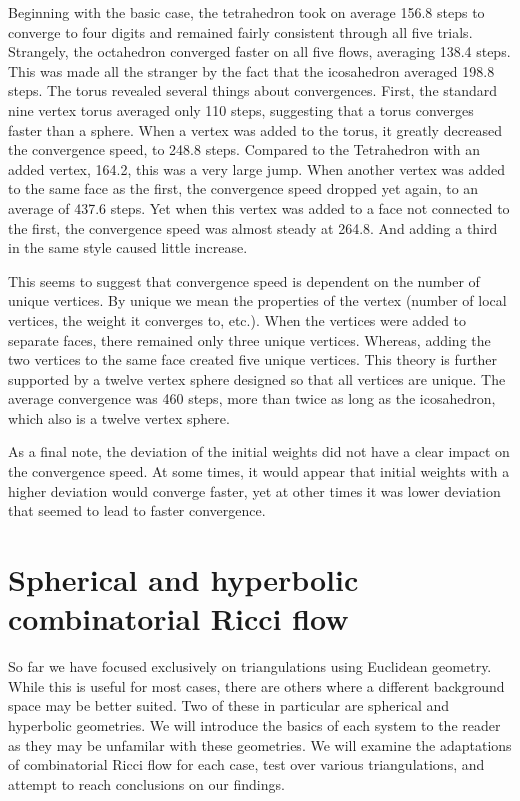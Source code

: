 \documentclass[12pt]{article}
\begin{document}
\noindent Beginning with the basic case, the tetrahedron took on average 156.8 steps to converge to four digits and remained fairly consistent through all five trials. Strangely, the octahedron converged faster on all five flows, averaging 138.4 steps. This was made all the stranger by the fact that the icosahedron averaged 198.8 steps. The torus revealed several things about convergences. First, the standard nine vertex torus averaged only 110 steps, suggesting that a torus converges faster than a sphere. When a vertex was added to the torus, it greatly decreased the convergence speed, to 248.8 steps. Compared to the Tetrahedron with an added vertex, 164.2, this was a very large jump. When another vertex was added to the same face as the first, the convergence speed dropped yet again, to an average of 437.6 steps. Yet when this vertex was added to a face not connected to the first, the convergence speed was almost steady at 264.8. And adding a third in the same style caused little increase.\newline

\noindent This seems to suggest that convergence speed is dependent on the number of unique vertices. By unique we mean the properties of the vertex (number of local vertices, the weight it converges to, etc.). When the vertices were added to separate faces, there remained only three unique vertices. Whereas, adding the two vertices to the same face created five unique vertices. This theory is further supported by a twelve vertex sphere designed so that all vertices are unique. The average convergence was 460 steps, more than twice as long as the icosahedron, which also is a twelve vertex sphere.\newline

\noindent As a final note, the deviation of the initial weights did not have a clear impact on the convergence speed. At some times, it would appear that initial weights with a higher deviation would converge faster, yet at other times it was lower deviation that seemed to lead to faster convergence.

\section{Spherical and hyperbolic combinatorial Ricci flow}
\label{HypSphere}

So far we have focused exclusively on triangulations using Euclidean geometry. While this is useful for most cases, there are others where a different background space may be better suited. Two of these in particular are spherical and hyperbolic geometries. We will introduce the basics of each system to the reader as they may be unfamilar with these geometries. We will examine the adaptations of combinatorial Ricci flow for each case, test over various triangulations, and attempt to reach conclusions on our findings. 
\end{document}

